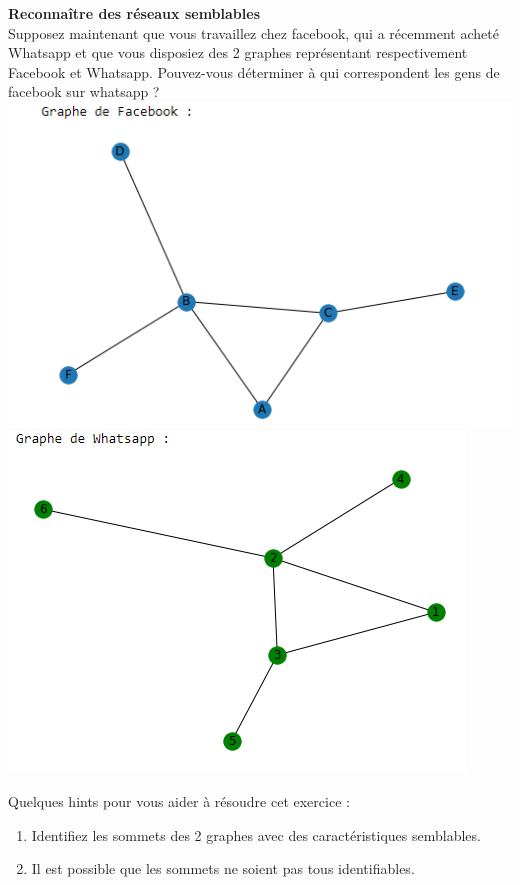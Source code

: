 \begin{Exercice}[5 minutes] \textbf{Reconnaître des réseaux semblables}\\
    Supposez maintenant que vous travaillez chez facebook, qui a récemment acheté Whatsapp et que vous disposiez des 2 graphes représentant respectivement Facebook et Whatsapp. Pouvez-vous déterminer à qui correspondent les gens de facebook sur whatsapp ?\\
    
    \includegraphics[]{Week 7/Network2.PNG}\\
    \includegraphics[]{Week 7/Network3.PNG}
    
    
    \begin{conseil}
    Quelques hints pour vous aider à résoudre cet exercice :
    \begin{enumerate}
        \item Identifiez les sommets des 2 graphes avec des caractéristiques semblables.
        \item Il est possible que les sommets ne soient pas tous identifiables.
    \end{enumerate}
        

\end{conseil}
\end{Exercice}
